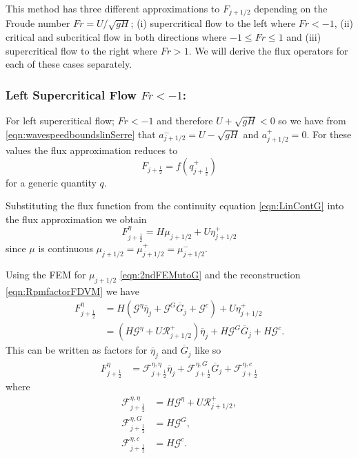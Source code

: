 This method has three different approximations to $F_{j+1/2}$ depending on the Froude number $Fr = {U}/{\sqrt{gH}}$; (i)
supercritical flow to the left where $Fr < -1$, (ii) critical and subcritical flow in both directions where $-1 \le Fr \le 1$ and (iii) supercritical flow to the right where $Fr > 1$. We will derive the flux operators for each of these cases separately.

\subsubsection{Left Supercritical Flow $Fr < -1$:}
For left supercritical flow; $Fr < -1$ and therefore $U + \sqrt{g H} < 0$ so we have from \eqref{eqn:wavespeedboundslinSerre} that $a^-_{j+ 1/2} = U - \sqrt{g H}$ and $a^+_{j+ 1/2} =  0$. For these values the flux approximation reduces to 
\begin{equation}
F_{j+\frac{1}{2}} = f\left(q^+_{j+\frac{1}{2}}\right)
\label{eqn:fluxleftsupercrit}
\end{equation}
for a generic quantity $q$.

Substituting the flux function from the continuity equation \eqref{eqn:LinContG} into the flux approximation we obtain
\begin{equation*}
F^\eta_{j+\frac{1}{2}} = H \mu_{j+1/2} + U \eta^+_{j+1/2}
\end{equation*}
since $\mu$ is continuous $\mu_{j+1/2} = \mu_{j+1/2}^+ = \mu_{j+1/2}^- $. 

Using the FEM for $\mu_{j+1/2}$ \eqref{eqn:2ndFEMutoG} and the reconstruction \eqref{eqn:RpmfactorFDVM} we have
\begin{align*}
F^\eta_{j+\frac{1}{2}} &= H \left(\mathcal{G}^{\eta} \overline{\eta}_{j} + \mathcal{G}^G \overline{G}_{j} + \mathcal{G}^c\right) + U \eta^+_{j+1/2} \nonumber \\ &= \left(H \mathcal{G}^{\eta} + U \mathcal{R}^+_{j+1/2} \right)  \overline{\eta}_{j} + H \mathcal{G}^G \overline{G}_{j} + H\mathcal{G}^c .
\end{align*}
This can be written as factors for $\overline{\eta}_{j}$ and $\overline{G}_{j}$ like so
\begin{align*}
F^\eta_{j+\frac{1}{2}} &= \mathcal{F}^{\eta, \eta}_{j+\frac{1}{2}} \overline{\eta}_{j} + \mathcal{F}^{\eta, G}_{j+\frac{1}{2}} \overline{G}_{j} + \mathcal{F}^{\eta, c}_{j+\frac{1}{2}}
\end{align*}
where
\begin{align*}
\mathcal{F}^{\eta, \eta}_{j+\frac{1}{2}} &=  H \mathcal{G}^{\eta} + U \mathcal{R}^+_{j+1/2},\\
\mathcal{F}^{\eta, G}_{j+\frac{1}{2}} &=  H \mathcal{G}^G,\\
\mathcal{F}^{\eta, c}_{j+\frac{1}{2}} &=  H\mathcal{G}^c.
\end{align*}

